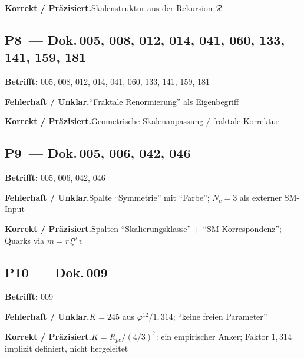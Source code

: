 \smallskip\noindent\textbf{Korrekt / Präzisiert.}\quad Skalenstruktur aus der Rekursion $\mathcal{R}$


\medskip


\subsection*{P8~--- Dok.\,005, 008, 012, 014, 041, 060, 133, 141, 159, 181}

\noindent\textbf{Betrifft:} 005, 008, 012, 014, 041, 060, 133, 141, 159, 181


\smallskip\noindent\textbf{Fehlerhaft / Unklar.}\quad \enquote{Fraktale Renormierung} als Eigenbegriff


\smallskip\noindent\textbf{Korrekt / Präzisiert.}\quad Geometrische Skalen\-anpassung / fraktale Korrektur


\medskip


\subsection*{P9~--- Dok.\,005, 006, 042, 046}

\noindent\textbf{Betrifft:} 005, 006, 042, 046


\smallskip\noindent\textbf{Fehlerhaft / Unklar.}\quad Spalte \enquote{Symmetrie} mit \enquote{Farbe}; \newline
  $N_c = 3$ als externer SM-Input


\smallskip\noindent\textbf{Korrekt / Präzisiert.}\quad Spalten \enquote{Skalierungs\-klasse} + \enquote{SM-Korrespondenz}; \newline
  Quarks via $m = r\,\xi^p\,v$


\medskip


\subsection*{P10~--- Dok.\,009}

\noindent\textbf{Betrifft:} 009


\smallskip\noindent\textbf{Fehlerhaft / Unklar.}\quad $K = 245$ aus $\varphi^{12}/1{,}314$; \newline
  \enquote{keine freien Parameter}


\smallskip\noindent\textbf{Korrekt / Präzisiert.}\quad $K = R_{pe}/(4/3)^7$: ein empirischer Anker; \newline
  Faktor $1{,}314$ implizit definiert, nicht hergeleitet


